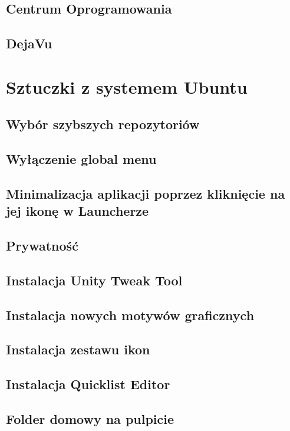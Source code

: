 \documentclass[a4paper,11pt,oneside]{mwart}
\begin{document}
        \subsection{Centrum Oprogramowania}
        \subsection{DejaVu}
\section{Sztuczki z systemem Ubuntu}
		
		\subsection{Wybór szybszych repozytoriów}
			
		\subsection{Wyłączenie global menu}
			
		\subsection{Minimalizacja aplikacji poprzez kliknięcie na jej ikonę w Launcherze}
			
		\subsection{Prywatność}
			
        \subsection{Instalacja Unity Tweak Tool}
        		
        \subsection{Instalacja nowych motywów graficznych}
        		
        \subsection{Instalacja zestawu ikon}
        		
        	\subsection{Instalacja Quicklist Editor}
        		
        \subsection{Folder domowy na pulpicie}
        		        
\end{document}
